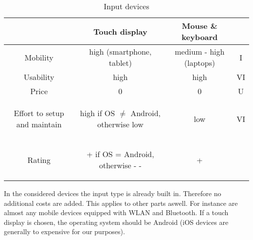 \documentclass[]{scrreprt}
\begin{document}
	\begin{table}[H]
		\caption{Input devices} \label{tab:ID}
		\centering
	\begin{tabular}{|c||c|c|c|}
		\hline 
		& Touch display & Mouse \& keyboard &\\ 
		\hline \hline
		Mobility & high (smartphone, tablet) & medium - high (laptops) & I\\ 
		\hline
		Usability & high & high & VI\\
		\hline
		Price & 0 & 0 & U\\
		\hline
		\begin{pbox}{2.5cm}{\vspace{.2\baselineskip}Effort to setup and maintain\vspace{.3\baselineskip}} \end{pbox}  &
		\begin{pbox}{4.0cm}{high if OS $\ne$ Android, otherwise low} \end{pbox}& \begin{pbox}{4.0cm}{low} \end{pbox} & VI\\
		
		\hline \hline
		Rating & \begin{pbox}{4.0cm}{\vspace{.2\baselineskip}+ if OS = Android, otherwise - -\vspace{.3\baselineskip}} \end{pbox} & + & \\
		\hline

	\end{tabular}
	\end{table}
	
	In the considered devices the input type is already built in. Therefore no additional costs are added. This applies to other parts aswell. For instance are almost any mobile devices equipped with WLAN and Bluetooth. If a touch display is chosen, the operating system should be Android (iOS devices are generally to expensive for our purposes). 
	
\end{document}
